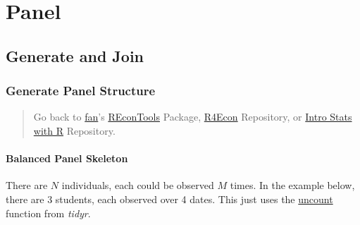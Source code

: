 \documentclass[
]{book}
\newenvironment{Shaded}{\begin{snugshade}}{\end{snugshade}}
\newcommand{\CommentTok}[1]{\textcolor[rgb]{0.56,0.35,0.01}{\textit{#1}}}
\newcommand{\DataTypeTok}[1]{\textcolor[rgb]{0.13,0.29,0.53}{#1}}
\newcommand{\DecValTok}[1]{\textcolor[rgb]{0.00,0.00,0.81}{#1}}
\newcommand{\ErrorTok}[1]{\textcolor[rgb]{0.64,0.00,0.00}{\textbf{#1}}}
\newcommand{\KeywordTok}[1]{\textcolor[rgb]{0.13,0.29,0.53}{\textbf{#1}}}
\newcommand{\NormalTok}[1]{#1}
\newcommand{\OperatorTok}[1]{\textcolor[rgb]{0.81,0.36,0.00}{\textbf{#1}}}
\newcommand{\StringTok}[1]{\textcolor[rgb]{0.31,0.60,0.02}{#1}}
\begin{document}
\hypertarget{panel}{%
\chapter{Panel}\label{panel}}

\hypertarget{generate-and-join}{%
\section{Generate and Join}\label{generate-and-join}}

\hypertarget{generate-panel-structure}{%
\subsection{Generate Panel Structure}\label{generate-panel-structure}}

\begin{quote}
Go back to \href{http://fanwangecon.github.io/CodeDynaAsset/}{fan}'s \href{https://fanwangecon.github.io/REconTools/}{REconTools} Package, \href{https://fanwangecon.github.io/R4Econ/}{R4Econ} Repository, or \href{https://fanwangecon.github.io/Stat4Econ/}{Intro Stats with R} Repository.
\end{quote}

\hypertarget{balanced-panel-skeleton}{%
\subsubsection{Balanced Panel Skeleton}\label{balanced-panel-skeleton}}

There are \(N\) individuals, each could be observed \(M\) times. In the example below, there are 3 students, each observed over 4 dates. This just uses the \href{https://tidyr.tidyverse.org/reference/uncount.html}{uncount} function from \emph{tidyr}.

\begin{Shaded}
\end{Shaded}
\end{document}
